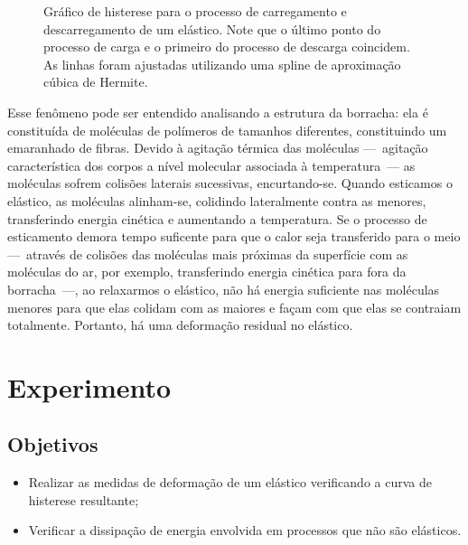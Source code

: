 \begin{figure}[!h]\forcerectofloat
	\centering
	
	\caption{Gráfico de histerese para o processo de carregamento e descarregamento de um elástico. Note que o último ponto do processo de carga e o primeiro do processo de descarga coincidem. As linhas foram ajustadas utilizando uma spline de aproximação cúbica de Hermite.}
	\label{Fig:HistereseElast}
\end{figure}

Esse fenômeno pode ser entendido analisando a estrutura da borracha: ela é constituída de moléculas de polímeros de tamanhos diferentes, constituindo um emaranhado de fibras. Devido à agitação térmica das moléculas ---~agitação característica dos corpos a nível molecular associada à temperatura~--- as moléculas sofrem colisões laterais sucessivas, encurtando-se. Quando esticamos o elástico, as moléculas alinham-se, colidindo lateralmente contra as menores, transferindo energia cinética e aumentando a temperatura. Se o processo de esticamento demora tempo suficente para que o calor seja transferido para o meio ---~através de colisões das moléculas mais próximas da superfície com as moléculas do ar, por exemplo, transferindo energia cinética para fora da borracha~---, ao relaxarmos o elástico, não há energia suficiente nas moléculas menores para que elas colidam com as maiores e façam com que elas se contraiam totalmente. Portanto, há uma deformação residual no elástico.

\section{Experimento}

\subsection{Objetivos}
\label{Sec:ObjetivosElasticidade}

\begin{itemize}
	\item Realizar as medidas de deformação de um elástico verificando a curva de histerese resultante;
	\item Verificar a dissipação de energia envolvida em processos que não são elásticos. 
\end{itemize}


